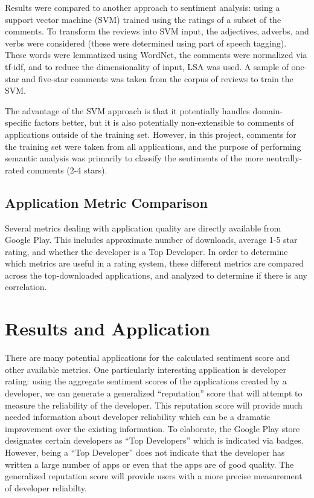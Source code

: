 \documentclass{acm_proc_article-sp}
\begin{document}
Results were compared to another approach to sentiment analysis: using a support vector machine (SVM) trained using the ratings of a subset of the comments.  To transform the reviews into SVM input, the adjectives, adverbs, and verbs were considered (these were determined using part of speech tagging).  These words were lemmatized using WordNet, the comments were normalized via tf-idf, and to reduce the dimensionality of input, LSA was used.  A sample of one-star and five-star comments was taken from the corpus of reviews to train the SVM.

The advantage of the SVM approach is that it potentially handles domain-specific factors better, but it is also potentially non-extensible to comments of applications outside of the training set.  However, in this project, comments for the training set were taken from all applications, and the purpose of performing semantic analysis was primarily to classify the sentiments of the more neutrally-rated comments (2-4 stars).


\subsection{Application Metric Comparison}
Several metrics dealing with application quality are directly available from Google Play.  This includes approximate number of downloads, average 1-5 star rating, and whether the developer is a Top Developer.  In order to determine which metrics are useful in a rating system, these different metrics are compared across the top-downloaded applications, and analyzed to determine if there is any correlation.

\section{Results and Application}\label{results}
There are many potential applications for the calculated sentiment score and other available metrics. One particularly interesting application is developer rating: using the aggregate sentiment scores of the applications created by a developer, we can generate a generalized ``reputation'' score that will attempt to measure the reliability of the developer.
This reputation score will provide much needed information about developer reliability which can be a dramatic improvement over the existing information. To elaborate, the Google Play store designates certain developers as ``Top Developers'' which is indicated via badges. However, being a ``Top Developer'' does not indicate that the developer has written a large number of apps or even that the apps are of good quality. The generalized reputation score will provide users with a more precise measurement of developer reliabilty.
\end{document}
